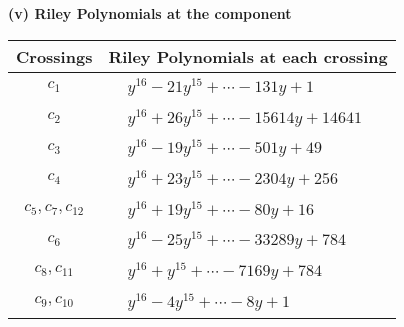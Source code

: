 \documentclass[1p]{elsarticle_modified}
\theoremstyle{definition}
\begin{document}
\newpage\renewcommand{\arraystretch}{1}
\flushleft \textbf{(v) Riley Polynomials at the component}\newline \\
\begin{tabular}{m{50pt}|m{274pt}}
Crossings & \hspace{64pt}Riley Polynomials at each crossing \\
\hline $$\begin{aligned}c_{1}\end{aligned}$$&$\begin{aligned}
&y^{16}-21 y^{15}+\cdots-131 y+1
\end{aligned}$\\
\hline $$\begin{aligned}c_{2}\end{aligned}$$&$\begin{aligned}
&y^{16}+26 y^{15}+\cdots-15614 y+14641
\end{aligned}$\\
\hline $$\begin{aligned}c_{3}\end{aligned}$$&$\begin{aligned}
&y^{16}-19 y^{15}+\cdots-501 y+49
\end{aligned}$\\
\hline $$\begin{aligned}c_{4}\end{aligned}$$&$\begin{aligned}
&y^{16}+23 y^{15}+\cdots-2304 y+256
\end{aligned}$\\
\hline $$\begin{aligned}c_{5},c_{7},c_{12}\end{aligned}$$&$\begin{aligned}
&y^{16}+19 y^{15}+\cdots-80 y+16
\end{aligned}$\\
\hline $$\begin{aligned}c_{6}\end{aligned}$$&$\begin{aligned}
&y^{16}-25 y^{15}+\cdots-33289 y+784
\end{aligned}$\\
\hline $$\begin{aligned}c_{8},c_{11}\end{aligned}$$&$\begin{aligned}
&y^{16}+y^{15}+\cdots-7169 y+784
\end{aligned}$\\
\hline $$\begin{aligned}c_{9},c_{10}\end{aligned}$$&$\begin{aligned}
&y^{16}-4 y^{15}+\cdots-8 y+1
\end{aligned}$\\
\hline
\end{tabular}\\~\\
\end{document}
